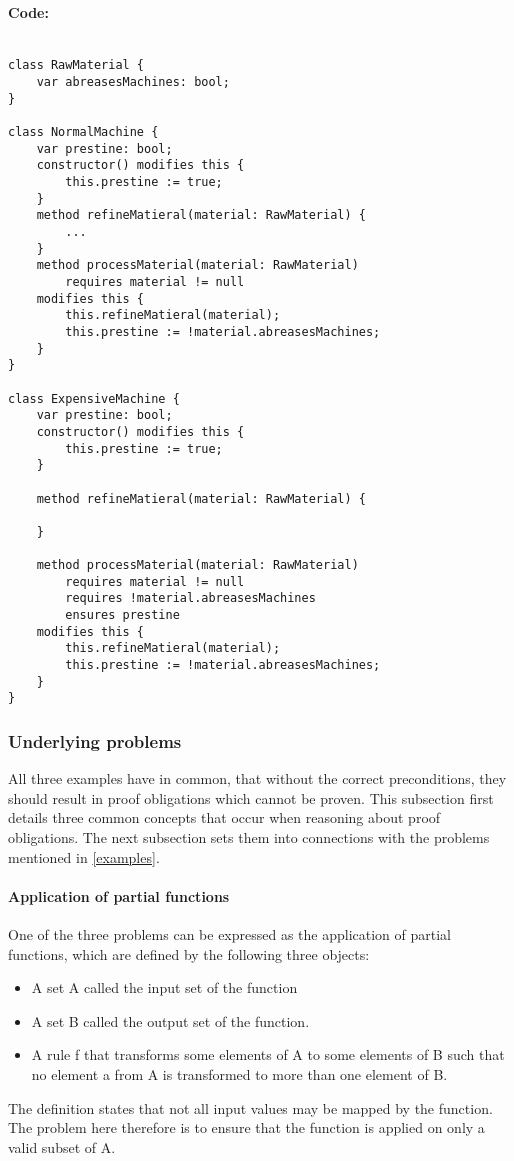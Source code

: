 \paragraph{Code:}
\begin{lstlisting}[language=dafny]

class RawMaterial {
	var abreasesMachines: bool;
}

class NormalMachine {
	var prestine: bool;
	constructor() modifies this {
		this.prestine := true;
	}
	method refineMatieral(material: RawMaterial) {
		...
	}
	method processMaterial(material: RawMaterial) 
		requires material != null
	modifies this {
		this.refineMatieral(material);
		this.prestine := !material.abreasesMachines;
	}
}

class ExpensiveMachine {
	var prestine: bool;
	constructor() modifies this {
		this.prestine := true;
	}
	
	method refineMatieral(material: RawMaterial) {
	
	}
	
	method processMaterial(material: RawMaterial) 
		requires material != null
		requires !material.abreasesMachines
		ensures prestine
	modifies this {
		this.refineMatieral(material);
		this.prestine := !material.abreasesMachines;
	}
}
\end{lstlisting}

\subsubsection{Underlying problems}
All three examples have in common, that without the correct preconditions, they should result in proof obligations which cannot be proven.
This subsection first details three common concepts that occur when reasoning about proof obligations. The next subsection sets them into connections with the problems mentioned in \ref{examples}.

\paragraph{Application of partial functions} \label{partial function}
One of the three problems can be expressed as the application of partial functions, which are defined by the following three objects:
\begin{itemize}
	\item A set A called the input set of the function
	\item A set B called the output set of the function.
	\item A rule f that transforms some elements of A to some elements of B such that no element a from A is transformed to more than one element of B.\cite[197]{khoussainov}
\end{itemize}
The definition states that not all input values may be mapped by the function. The problem here therefore is to ensure that the function is applied on only a valid subset of A.


